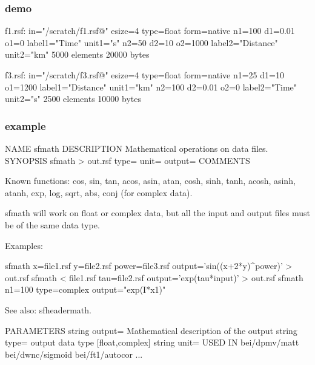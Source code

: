 \begin{frame}[fragile] \frametitle{demo}
  
  
  \vfill
\tiny
\begin{semiverbatim}
f1.rsf:
    in="/scratch/f1.rsf@"
    esize=4 type=float form=native
    n1=100         d1=0.01        o1=0          label1="Time" unit1="s"
    n2=50          d2=10          o2=1000       label2="Distance" unit2="km"
        5000 elements 20000 bytes
\end{semiverbatim}
\large

  \vfill
\tiny
\begin{semiverbatim}
f3.rsf:
    in="/scratch/f3.rsf@"
    esize=4 type=float form=native
    n1=25          d1=10          o1=1200       label1="Distance" unit1="km"
    n2=100         d2=0.01        o2=0          label2="Time" unit2="s"
        2500 elements 10000 bytes
\end{semiverbatim}
\end{frame}
\cwpnote{}

\begin{frame}
\end{frame}
\cwpnote{}


\begin{frame}[fragile] \frametitle{example}

  \tiny
\begin{semiverbatim}
NAME
        sfmath
DESCRIPTION
        Mathematical operations on data files.
SYNOPSIS
        sfmath > out.rsf type= unit= output=
COMMENTS

        Known functions: cos,  sin,  tan,  acos,  asin,  atan,
                         cosh, sinh, tanh, acosh, asinh, atanh,
                         exp,  log,  sqrt, abs, conj (for complex data).

        sfmath will work on float or complex data, but all the input and output
        files must be of the same data type.

        Examples:

        sfmath x=file1.rsf y=file2.rsf power=file3.rsf output='sin((x+2*y)^power)' > out.rsf
        sfmath < file1.rsf tau=file2.rsf output='exp(tau*input)' > out.rsf
        sfmath n1=100 type=complex output="exp(I*x1)"

        See also: sfheadermath.

PARAMETERS
        string  output=         Mathematical description of the output
        string  type=   output data type [float,complex]
        string  unit=
USED IN
        bei/dpmv/matt
        bei/dwnc/sigmoid
        bei/ft1/autocor
	...
\end{semiverbatim}
\end{frame}
\cwpnote{}

